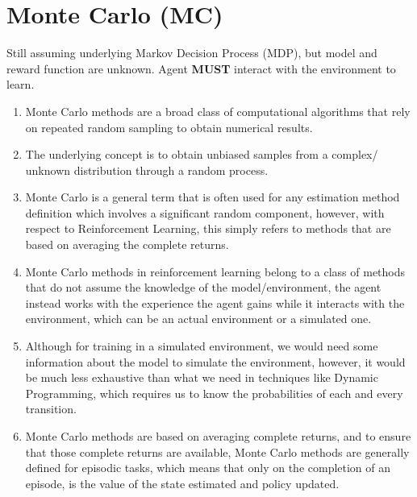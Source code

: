 \section{Monte Carlo (MC)}\label{Monte Carlo (MC)}
Still assuming underlying Markov Decision Process (MDP), but model and reward function are unknown. Agent \textbf{MUST} interact with the environment to learn.

\begin{enumerate}
    \item Monte Carlo methods are a broad class of computational algorithms that rely on repeated random sampling to obtain numerical results.

    \item The underlying concept is to obtain unbiased samples from a complex/ unknown distribution through a random process.

    \item Monte Carlo is a general term that is often used for any estimation method definition which involves a significant random component, however, with respect to Reinforcement Learning, this simply refers to methods that are based on averaging the complete returns. \cite{medium/nerd-for-tech/monte-carlo-methods-for-reinforcement-learning-d30d874dd817}

    \item Monte Carlo methods in reinforcement learning belong to a class of methods that do not assume the knowledge of the model/environment, the agent instead works with the experience the agent gains while it interacts with the environment, which can be an actual environment or a simulated one. \cite{medium/nerd-for-tech/monte-carlo-methods-for-reinforcement-learning-d30d874dd817}
    
    \item Although for training in a simulated environment, we would need some information about the model to simulate the environment, however, it would be much less exhaustive than what we need in techniques like Dynamic Programming, which requires us to know the probabilities of each and every transition. \cite{medium/nerd-for-tech/monte-carlo-methods-for-reinforcement-learning-d30d874dd817}

    \item Monte Carlo methods are based on averaging complete returns, and to ensure that those complete returns are available, Monte Carlo methods are generally defined for episodic tasks, which means that only on the completion of an episode, is the value of the state estimated and policy updated. \cite{medium/nerd-for-tech/monte-carlo-methods-for-reinforcement-learning-d30d874dd817}

\end{enumerate}

